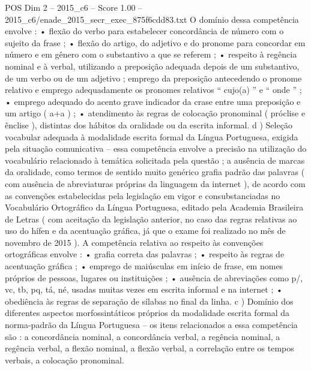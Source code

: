 \begin{textsample}{POS Dim 2 – 2015\_c6 – Score 1.00 – 2015\_c6/enade\_2015\_secr\_exec\_875f6cdd83.txt}
O domínio dessa competência envolve : • flexão do verbo para estabelecer concordância de número com o sujeito da frase ; • flexão do artigo, do adjetivo e do pronome para concordar em número e em gênero com o substantivo a que se referem ; • respeito à regência nominal e à verbal, utilizando a preposição adequada depois de um substantivo, de um verbo ou de um adjetivo ; emprego da preposição antecedendo o pronome relativo e emprego adequadamente os pronomes relativos “ cujo(a) ” e “ onde ” ; • emprego adequado do acento grave indicador da crase entre uma preposição e um artigo ( a+a ) ; • atendimento às regras de colocação pronominal ( próclise e ênclise ), distintas dos hábitos da oralidade ou da escrita informal. d ) Seleção vocabular adequada à modalidade escrita formal da Língua Portuguesa, exigida pela situação comunicativa – essa competência envolve a precisão na utilização do vocabulário relacionado à temática solicitada pela questão ; a ausência de marcas da oralidade, como termos de sentido muito genérico grafia padrão das palavras ( com ausência de abreviaturas próprias da linguagem da internet ), de acordo com as convenções estabelecidas pela legislação em vigor e consubstanciadas no Vocabulário Ortográfico da Língua Portuguesa, editado pela Academia Brasileira de Letras ( com aceitação da legislação anterior, no caso das regras relativas ao uso do hífen e da acentuação gráfica, já que o exame foi realizado no mês de novembro de 2015 ).
A competência relativa ao respeito às convenções ortográficas envolve : • grafia correta das palavras ; • respeito às regras de acentuação gráfica ; • emprego de maiúsculas em início de frase, em nomes próprios de pessoas, lugares ou instituições ; • ausência de abreviações como p/, vc, tb, pq, tá, né, usadas muitas vezes em escrita informal e na internet ; • obediência às regras de separação de sílabas no final da linha. c ) Domínio dos diferentes aspectos morfossintáticos próprios da modalidade escrita formal da norma-padrão da Língua Portuguesa – os itens relacionados a essa competência são : a concordância nominal, a concordância verbal, a regência nominal, a regência verbal, a flexão nominal, a flexão verbal, a correlação entre os tempos verbais, a colocação pronominal.

\end{textsample}
